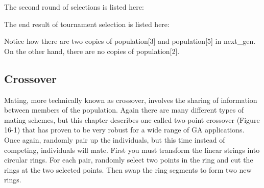 The second round of selections is listed here:


The end result of tournament selection is listed here:


Notice how there are two copies of \textsf{population[3]} and
\textsf{population[5]} in \textsf{next\_gen}. On the other hand, there
are no copies of \textsf{population[2]}.

\subsection{Crossover}

Mating, more technically known as crossover, involves the sharing of
information between members of the population. Again there are many
different types of mating schemes, but this chapter describes one
called two-point crossover (Figure 16-1) that has proven to be very
robust for a wide range of GA applications. Once again, randomly pair
up the individuals, but this time instead of competing, individuals
will mate. First you must transform the linear strings into circular
rings. For each pair, randomly select two points in the ring and cut
the rings at the two selected points. Then swap the ring segments to
form two new rings.\\


